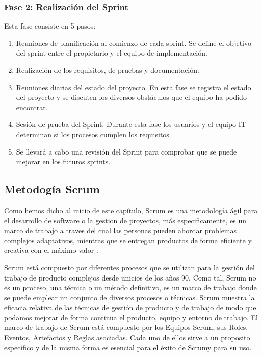 \subsubsection{Fase 2: Realización del Sprint}

Esta fase consiste en 5 pasos:

\begin{enumerate}
	\item Reuniones de planificación al comienzo de cada sprint. Se define el objetivo del sprint entre el propietario y el equipo de implementación.
	\item Realización de los requisitos, de pruebas y documentación.
	\item Reuniones diarias del estado del proyecto. En esta fase se registra el estado del proyecto y se discuten los diversos obstáculos que el equipo ha podido encontrar.
	\item Sesión de prueba del Sprint. Durante esta fase los usuarios y el equipo IT determinan si los procesos cumplen los requisitos.
	\item Se llevará a cabo una revisión del Sprint para comprobar que se puede mejorar en los futuros sprints.
\end{enumerate}

\subsection{Metodogía Scrum}

Como hemos dicho al inicio de este capítulo, Scrum es una metodología ágil para el desarrollo de software o la gestion de proyectos, más especificamente, es un marco de trabajo a traves del cual las personas pueden abordar problemas complejos adaptativos, mientras que se entregan productos de forma eficiente y creativa con el máximo valor \cite{scrum-guia}.

Scrum está compuesto por diferentes procesos que se utilizan para la gestión del trabajo de producto complejos desde unicios de los años 90. Como tal, Scrum no es un proceso, una técnica o un método definitivo, es un marco de trabajo donde se puede emplear un conjunto de diversos procesos o técnicas. Scrum muestra la eficacia relativa de las técnicas de gestión de producto y de trabajo de modo que podamos mejorar de forma continua el producto, equipo y entorno de trabajo. El marco de trabajo de Scrum está compuesto por los Equipos Scrum, sus Roles, Eventos, Artefactos y Reglas asociadas. Cada uno de ellos sirve a un proposito específico y de la misma forma es esencial para el éxito de Scrumy para su uso.

